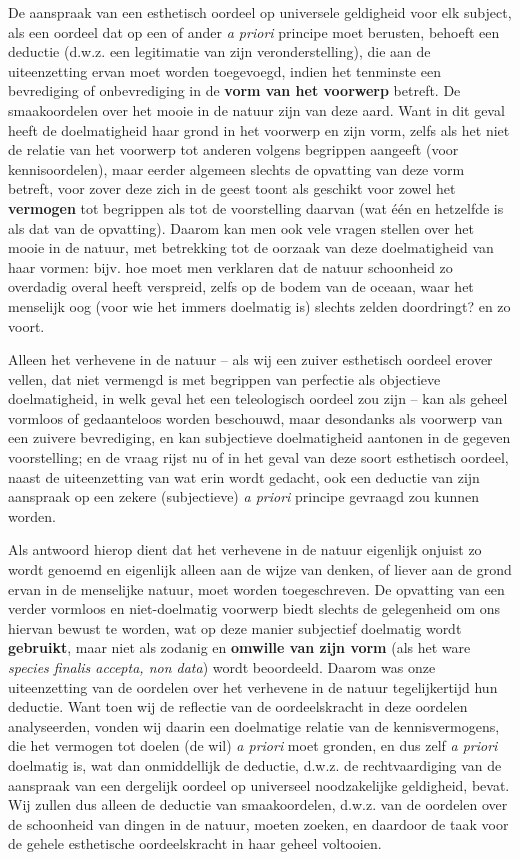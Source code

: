 De aanspraak van een esthetisch oordeel op universele geldigheid voor elk subject, als een oordeel dat op een of ander \textit{a priori} principe moet berusten, behoeft een deductie (d.w.z. een legitimatie van zijn veronderstelling), die aan de uiteenzetting ervan moet worden toegevoegd, indien het tenminste een bevrediging of onbevrediging in de \textbf{vorm van het voorwerp} betreft. De smaakoordelen over het mooie in de natuur zijn van deze aard. Want in dit geval heeft de doelmatigheid haar grond in het voorwerp en zijn vorm, zelfs als het niet de relatie van het voorwerp tot anderen volgens begrippen aangeeft (voor kennisoordelen), maar eerder algemeen slechts de opvatting van deze vorm betreft, voor zover deze zich in de geest toont als geschikt voor zowel het \textbf{vermogen} tot begrippen als tot de voorstelling daarvan (wat één en hetzelfde is als dat van de opvatting). Daarom kan men ook vele vragen stellen over het mooie in de natuur, met betrekking tot de oorzaak van deze doelmatigheid van haar vormen: bijv. hoe moet men verklaren dat de natuur schoonheid zo overdadig overal heeft verspreid, zelfs op de bodem van de oceaan, waar het menselijk oog (voor wie het immers doelmatig is) slechts zelden doordringt? en zo voort.

Alleen het verhevene in de natuur – als wij een zuiver esthetisch oordeel erover vellen, dat niet vermengd is met begrippen van perfectie als objectieve doelmatigheid, in welk geval het een teleologisch oordeel zou zijn – kan als geheel vormloos of gedaanteloos worden beschouwd, maar desondanks als voorwerp van een zuivere bevrediging, en kan subjectieve doelmatigheid aantonen in de gegeven voorstelling; en de vraag rijst nu of in het geval van deze soort esthetisch oordeel, naast de uiteenzetting van wat erin wordt gedacht, ook een deductie van zijn aanspraak op een zekere (subjectieve) \textit{a priori} principe gevraagd zou kunnen worden.

Als antwoord hierop dient dat het verhevene in de natuur eigenlijk onjuist zo wordt genoemd en eigenlijk alleen aan de wijze van denken, of liever aan de grond ervan in de menselijke natuur, moet worden toegeschreven. De opvatting van een verder vormloos en niet-doelmatig voorwerp biedt slechts de gelegenheid om ons hiervan bewust te worden, wat op deze manier subjectief doelmatig wordt \textbf{gebruikt}, maar niet als zodanig en \textbf{omwille van zijn vorm} (als het ware \textit{species finalis accepta, non data}) wordt beoordeeld. Daarom was onze uiteenzetting van de oordelen over het verhevene in de natuur tegelijkertijd hun deductie. Want toen wij de reflectie van de oordeelskracht in deze oordelen analyseerden, vonden wij daarin een doelmatige relatie van de kennisvermogens, die het vermogen tot doelen (de wil) \textit{a priori} moet gronden, en dus zelf \textit{a priori} doelmatig is, wat dan onmiddellijk de deductie, d.w.z. de rechtvaardiging van de aanspraak van een dergelijk oordeel op universeel noodzakelijke geldigheid, bevat.
Wij zullen dus alleen de deductie van smaakoordelen, d.w.z. van de oordelen over de schoonheid van dingen in de natuur, moeten zoeken, en daardoor de taak voor de gehele esthetische oordeelskracht in haar geheel voltooien.

